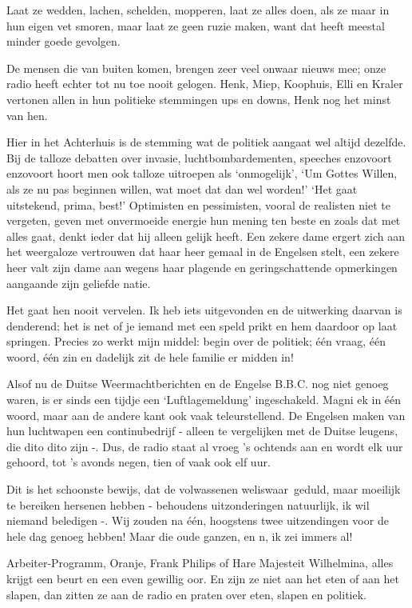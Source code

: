 \documentclass{book}
\begin{document}
Laat ze wedden, lachen, schelden, mopperen, laat ze alles doen, als ze
maar in hun eigen vet smoren, maar laat ze geen ruzie maken, want dat
heeft meestal minder goede gevolgen.

De mensen die van buiten komen, brengen zeer veel onwaar nieuws mee;
onze radio heeft echter tot nu toe nooit gelogen. Henk, Miep, Koophuis,
Elli en Kraler vertonen allen in hun politieke stemmingen ups en downs,
Henk nog het minst van hen.

Hier in het Achterhuis is de stemming wat de politiek aangaat wel altijd
dezelfde. Bij de talloze debatten over invasie, luchtbombardementen,
speeches enzovoort enzovoort hoort men ook talloze uitroepen als
`onmogelijk', `Um Gottes Willen, als ze nu pas beginnen willen, wat moet
dat dan wel worden!' `Het gaat uitstekend, prima, best!' Optimisten en
pessimisten, vooral de realisten niet te vergeten, geven met onvermoeide
energie hun mening ten beste en zoals dat met alles gaat, denkt ieder
dat hij alleen gelijk heeft. Een zekere dame ergert zich aan het
weergaloze vertrouwen dat haar heer gemaal in de Engelsen stelt, een
zekere heer valt zijn dame aan wegens haar plagende en geringschattende
opmerkingen aangaande zijn geliefde natie.

Het gaat hen nooit vervelen. Ik heb iets uitgevonden en de uitwerking
daarvan is denderend; het is net of je iemand met een speld prikt en hem
daardoor op laat springen. Precies zo werkt mijn middel: begin over de
politiek; één vraag, één woord, één zin en dadelijk zit de hele familie
er midden in!

Alsof nu de Duitse Weermachtberichten en de Engelse B.B.C. nog niet
genoeg waren, is er sinds een tijdje een `Luftlagemeldung' ingeschakeld.
Magni ek in één woord, maar aan de andere kant ook vaak teleurstellend.
De Engelsen maken van hun luchtwapen een continubedrijf - alleen te
vergelijken met de Duitse leugens, die dito dito zijn -. Dus, de radio
staat al vroeg 's ochtends aan en wordt elk uur gehoord, tot 's avonds
negen, tien of vaak ook elf uur.

Dit is het schoonste bewijs, dat de volwassenen weliswaar~geduld, maar
moeilijk te bereiken hersenen hebben - behoudens uitzonderingen
natuurlijk, ik wil niemand beledigen -. Wij zouden na één, hoogstens
twee uitzendingen voor de hele dag genoeg hebben! Maar die oude ganzen,
en n, ik zei immers al!

Arbeiter-Programm, Oranje, Frank Philips of Hare Majesteit Wilhelmina,
alles krijgt een beurt en een even gewillig oor. En zijn ze niet aan het
eten of aan het slapen, dan zitten ze aan de radio en praten over eten,
slapen en politiek.
\end{document}

